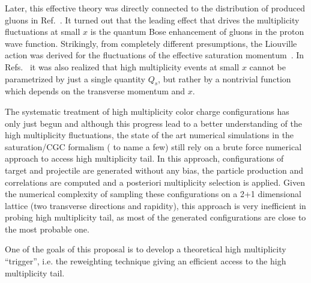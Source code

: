 Later, this effective theory was directly connected to 
the distribution of produced gluons in Ref.~\cite{Kovner:2018azs}. 
It turned out that the leading effect that drives the multiplicity 
fluctuations at small $x$ is the quantum Bose enhancement of gluons in the
proton wave function. Strikingly, from completely different presumptions,
the Liouville action was derived for the fluctuations of the effective saturation 
momentum~\cite{Iancu:2004es,Marquet:2006xm,Iancu:2007st}. 
In Refs.~\cite{Dumitru:2017cwt,Dumitru:2017ftq,Dumitru:2018iko} 
it was also realized that high multiplicity events at small $x$ 
cannot be parametrized by just a single  quantity  $Q_s$, 
but rather by a nontrivial function which depends on the transverse 
momentum and $x$. 

The systematic treatment of high multiplicity 
color charge configurations has only just begun and  
although this progress lead to a better understanding of the high multiplicity fluctuations, 
the state of the art numerical simulations in the saturation/CGC formalism 
(\cite{Mantysaari:2017cni,Mace:2018vwq,Mace:2018yvl} to name a few)
still rely 
on a brute force numerical approach to access high multiplicity tail. 
In this approach, configurations of target and projectile are generated 
without any bias, the particle production and correlations are computed and a posteriori 
multiplicity selection is applied. 
Given the numerical complexity of sampling these configurations  on a 2+1 dimensional lattice
(two transverse directions and rapidity),  
this approach  is very inefficient in probing 
high multiplicity tail, as most of the generated configurations are close to the most probable 
one. 

One of the goals of this proposal is to develop a theoretical high multiplicity ``trigger'', 
i.e. the reweighting technique giving an efficient access to the high multiplicity tail.   

